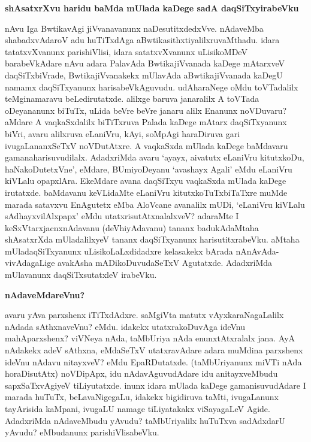 {\bigskip
\noindent
{\large\bf shAsatxrXvu haridu baMda mUlada kaDege sadA daqSiTxyirabeVku}}\label{page142}
\medskip

\noindent
nAvu Iga BwtikavAgi jiVvanavanunx naDesutitxdedxVve. nAdaveMba shabadxvAdaroV adu huTiTxdAga aBwtikasithxtiyalilxruvaMthadu. idara tatatxvXvanunx parishiVlisi, idara satatxvXvanunx uLisikoMDeV barabeVkAdare nAvu adara PalavAda BwtikajiVvanada kaDege mAtarxveV daqSiTxbiVrade, BwtikajiVvanakekx mUlavAda aBwtika\-jiVvanada kaDegU namamx daqSiTxyanunx harisabeVkAguvudu. udAharaNege oMdu toVTadalilx teMgina\-maravu beLedirutatxde. alilxge baruva janaralilx A toVTada oDeyananunx biTuTx, uLida beVre beVre janaru alilx Enanunx noVDuvaru? aMdare A vaqkaSxdalilx biTiTxruva Palada kaDege mAtarx daqSiTxyanunx biVri, avaru alilxruva eLaniVru, kAyi, soMpAgi haraDiruva gari ivugaLananxSeTxV noVDutAtxre. A vaqkaSxda mU\-lada kaDege baMdavaru gamanaharisuvudilalx. AdadxriMda avaru `ayayx, aivatutx eLaniVru kitutx\-koDu, haNakoDutetxVne', eMdare, BUmiyoDeyanu `avashayx Agali' eMdu eLaniVru kiVLalu opapxlAra. EkeM\-dare avana daqSiTxyu vaqkaSxda mUlada kaDege irutatxde. baMdavanu keVLidaMte eLaniVru kitutxkoTuTx\-biTaTxre muMde marada satavxvu EnAgutetx eMba AloVcane avanalilx mUDi, `eLaniVru kiVLalu sAdhayxvi\-lAlxpapx' eMdu utatxrisutAtxnalalxveV? adaraMte I keSxVtarxjacnxnAdavanu (deVhiyAdavanu) tananx badukAdaMtaha shA\-satxrXda mUladalilxyeV tananx daqSiTxyanunx harisutitxrabeVku. aMtaha mUladaqSiTxyanunx uLisikoLaLxdidadxre kelasakekx bArada nAnAvAda-vivAdagaLige avakAsha mADikoDuvudaSeTxV Agutatxde. AdadxriMda mUla\-vanunx daqSiTxsutatxleV irabeVku.

{\bigskip
\noindent
{\large\bf nAdaveMdareVnu?}}\label{page142}
\medskip

\noindent
avaru yAva parxshenx iTiTxdAdxre. saMgiVta matutx vAyxkaraNagaLalilx nAdada sAthxnaveVnu? eMdu. idakekx utatxrakoDuvAga ideVnu mahAparxshenx? viVNeya nAda, taMbUriya nAda enunxtAtxralalx jana. AyA nAdakekx adeV sAthxna, eMdaSeTxV utatxravAdare adara muMdina parxshenx ideVnu nAdavu nitayxveV? eMdu EpaRDutatxde. (taMbUriyanunx miVTi nAda horaDisutAtx) noVDipApx, idu nAdavAguvudAdare idu anitayxveMbudu sapxSaTxvAgiyeV tiLiyutatxde. inunx idara mUlada kaDege gamanisuvudAdare I marada huTuTx, beLavaNigegaLu, idakekx bigidiruva taMti, ivugaLanunx tayArisida kaMpani, ivugaLU namage\- tiLiyatakakx viSayagaLeV Agide. AdadxriMda nAdaveMbudu yAvudu? taMbUriyalilx huTuTxva sadAdx\-darU yAvudu? eMbudanunx parishiVlisabeVku. 

